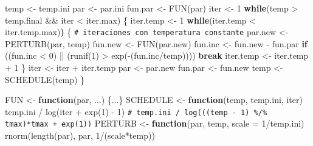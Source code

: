 \documentclass[
]{book}
\newenvironment{Shaded}{\begin{snugshade}}{\end{snugshade}}
\newcommand{\AttributeTok}[1]{\textcolor[rgb]{0.77,0.63,0.00}{#1}}
\newcommand{\CommentTok}[1]{\textcolor[rgb]{0.56,0.35,0.01}{\textit{#1}}}
\newcommand{\ControlFlowTok}[1]{\textcolor[rgb]{0.13,0.29,0.53}{\textbf{#1}}}
\newcommand{\DecValTok}[1]{\textcolor[rgb]{0.00,0.00,0.81}{#1}}
\newcommand{\ErrorTok}[1]{\textcolor[rgb]{0.64,0.00,0.00}{\textbf{#1}}}
\newcommand{\FunctionTok}[1]{\textcolor[rgb]{0.00,0.00,0.00}{#1}}
\newcommand{\NormalTok}[1]{#1}
\newcommand{\OtherTok}[1]{\textcolor[rgb]{0.56,0.35,0.01}{#1}}
\newcommand{\SpecialCharTok}[1]{\textcolor[rgb]{0.00,0.00,0.00}{#1}}
\theoremstyle{break}
\theoremstyle{nonumberplain}
\renewcommand{\CommentTok}[1]{\textcolor[rgb]{0.41,0.41,0.41}{\texttt{#1}}}
\begin{document}
\begin{Shaded}
\begin{Highlighting}[]
\NormalTok{temp }\OtherTok{\textless{}{-}}\NormalTok{ temp.ini}
\NormalTok{par }\OtherTok{\textless{}{-}}\NormalTok{ par.ini}
\NormalTok{fun.par }\OtherTok{\textless{}{-}} \FunctionTok{FUN}\NormalTok{(par)}
\NormalTok{iter }\OtherTok{\textless{}{-}} \DecValTok{1}
\ControlFlowTok{while}\NormalTok{(temp }\SpecialCharTok{\textgreater{}}\NormalTok{ temp.final }\SpecialCharTok{\&\&}\NormalTok{ iter }\SpecialCharTok{\textless{}}\NormalTok{ iter.max) \{}
\NormalTok{  iter.temp }\OtherTok{\textless{}{-}} \DecValTok{1}
  \ControlFlowTok{while}\NormalTok{(iter.temp }\SpecialCharTok{\textless{}}\NormalTok{ iter.temp.max)}\ErrorTok{)}\NormalTok{ \{ }\CommentTok{\# iteraciones con temperatura constante}
\NormalTok{    par.new }\OtherTok{\textless{}{-}} \FunctionTok{PERTURB}\NormalTok{(par, temp)}
\NormalTok{    fun.new }\OtherTok{\textless{}{-}} \FunctionTok{FUN}\NormalTok{(par.new)}
\NormalTok{    fun.inc }\OtherTok{\textless{}{-}}\NormalTok{ fun.new }\SpecialCharTok{{-}}\NormalTok{ fun.par}
    \ControlFlowTok{if}\NormalTok{ ((fun.inc }\SpecialCharTok{\textless{}} \DecValTok{0}\NormalTok{) }\SpecialCharTok{||}\NormalTok{ (}\FunctionTok{runif}\NormalTok{(}\DecValTok{1}\NormalTok{) }\SpecialCharTok{\textgreater{}} \FunctionTok{exp}\NormalTok{(}\SpecialCharTok{{-}}\NormalTok{(fun.inc}\SpecialCharTok{/}\NormalTok{temp)))) }\ControlFlowTok{break}
\NormalTok{    iter.temp }\OtherTok{\textless{}{-}}\NormalTok{ iter.temp }\SpecialCharTok{+} \DecValTok{1}
\NormalTok{  \}}
\NormalTok{  iter }\OtherTok{\textless{}{-}}\NormalTok{ iter }\SpecialCharTok{+}\NormalTok{ iter.temp}
\NormalTok{  par }\OtherTok{\textless{}{-}}\NormalTok{ par.new}
\NormalTok{  fun.par }\OtherTok{\textless{}{-}}\NormalTok{ fun.new}
\NormalTok{  temp }\OtherTok{\textless{}{-}} \FunctionTok{SCHEDULE}\NormalTok{(temp)}
\NormalTok{\}}

\NormalTok{FUN }\OtherTok{\textless{}{-}} \ControlFlowTok{function}\NormalTok{(par, ...) \{...\}}
\NormalTok{SCHEDULE }\OtherTok{\textless{}{-}} \ControlFlowTok{function}\NormalTok{(temp, temp.ini, iter) }
\NormalTok{  temp.ini }\SpecialCharTok{/} \FunctionTok{log}\NormalTok{(iter }\SpecialCharTok{+} \FunctionTok{exp}\NormalTok{(}\DecValTok{1}\NormalTok{) }\SpecialCharTok{{-}} \DecValTok{1}\NormalTok{)}
  \CommentTok{\# temp.ini / log(((temp {-} 1) \%/\% tmax)*tmax + exp(1))}
\NormalTok{PERTURB }\OtherTok{\textless{}{-}} \ControlFlowTok{function}\NormalTok{(par, temp, }\AttributeTok{scale =} \DecValTok{1}\SpecialCharTok{/}\NormalTok{temp.ini) }
  \FunctionTok{rnorm}\NormalTok{(}\FunctionTok{length}\NormalTok{(par), par, }\DecValTok{1}\SpecialCharTok{/}\NormalTok{(scale}\SpecialCharTok{*}\NormalTok{temp))}
\end{Highlighting}
\end{Shaded}
\end{document}
